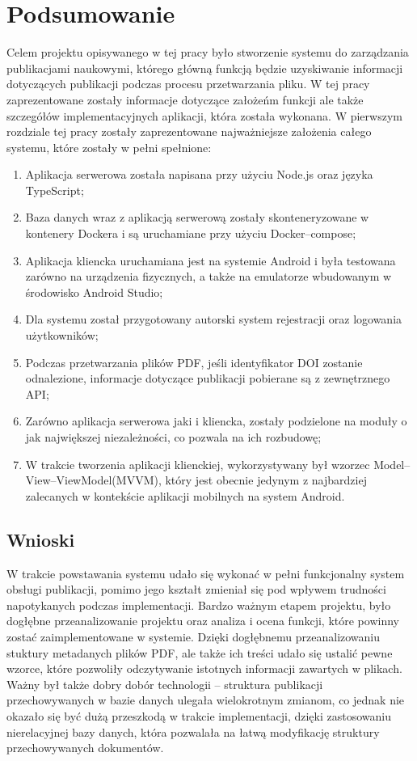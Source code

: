 \documentclass[a4paper,12pt,twoside,openany]{report}
\begin{document}
\chapter{Podsumowanie}
Celem projektu opisywanego w tej pracy było stworzenie systemu do zarządzania publikacjami naukowymi, którego główną funkcją będzie uzyskiwanie informacji dotyczących publikacji podczas procesu przetwarzania pliku. W tej pracy zaprezentowane zostały informacje dotyczące założeńm funkcji ale także szczegółów implementacyjnych aplikacji, która została wykonana. W pierwszym rozdziale tej pracy zostały zaprezentowane najważniejsze założenia całego systemu, które zostały w pełni spełnione:

\begin{enumerate}
	\item Aplikacja serwerowa została napisana przy użyciu Node.js oraz języka TypeScript;
	\item Baza danych wraz z aplikacją serwerową zostały skonteneryzowane w kontenery Dockera i są uruchamiane przy użyciu Docker--compose;
	\item Aplikacja kliencka uruchamiana jest na systemie Android i była testowana zarówno na urządzenia fizycznych, a także na emulatorze wbudowanym w środowisko Android Studio;
	\item Dla systemu został przygotowany autorski system rejestracji oraz logowania użytkowników;
	\item Podczas przetwarzania plików PDF, jeśli identyfikator DOI zostanie odnalezione, informacje dotyczące publikacji pobierane są z zewnętrznego API;
	\item Zarówno aplikacja serwerowa jaki i kliencka, zostały podzielone na moduły o jak największej niezależności, co pozwala na ich rozbudowę;
	\item W trakcie tworzenia aplikacji klienckiej, wykorzystywany był wzorzec Model--View--ViewModel(MVVM), który jest obecnie jedynym z najbardziej zalecanych w kontekście aplikacji mobilnych na system Android.
\end{enumerate}

\section{Wnioski}
W trakcie powstawania systemu udało się wykonać w pełni funkcjonalny system obsługi publikacji, pomimo jego kształt zmieniał się pod wpływem trudności napotykanych podczas implementacji. Bardzo ważnym etapem projektu, było dogłębne przeanalizowanie projektu oraz analiza i ocena funkcji, które powinny zostać zaimplementowane w systemie. Dzięki dogłębnemu przeanalizowaniu stuktury metadanych plików PDF, ale także ich treści udało się ustalić pewne wzorce, które pozwoliły odczytywanie istotnych informacji zawartych w plikach. Ważny był także dobry dobór technologii -- struktura publikacji przechowywanych w bazie danych ulegała wielokrotnym zmianom, co jednak nie okazało się być dużą przeszkodą w trakcie implementacji, dzięki zastosowaniu nierelacyjnej bazy danych, która pozwalała na łatwą modyfikację struktury przechowywanych dokumentów.
\end{document}
